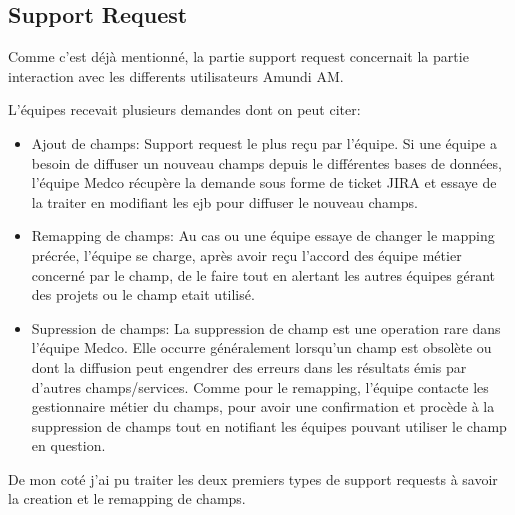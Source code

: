 \subsection{Support Request}
\par Comme c'est déjà mentionné, la partie support request concernait la partie interaction avec les differents utilisateurs Amundi AM. 
\par L'équipes recevait plusieurs demandes dont on peut citer: \\
\begin{itemize}
    \item Ajout de champs: Support request le plus reçu par l'équipe. Si une équipe a besoin de diffuser un nouveau champs depuis le différentes bases de données, l'équipe Medco récupère la demande sous forme de ticket JIRA et essaye de la traiter en modifiant les ejb pour diffuser le nouveau champs.
    \item Remapping de champs: Au cas ou une équipe essaye de changer le mapping précrée, l'équipe se charge, après avoir reçu l'accord des équipe métier concerné par le champ, de le faire tout en alertant les autres équipes gérant des projets ou le champ etait utilisé. 
    \item Supression de champs: La suppression de champ est une operation rare dans l'équipe Medco. Elle occurre généralement lorsqu'un champ est obsolète ou dont la diffusion peut engendrer des erreurs dans les résultats émis par d'autres champs/services. Comme pour le remapping, l'équipe contacte les gestionnaire métier du champs, pour avoir une confirmation et procède à la suppression de champs tout en notifiant les équipes pouvant utiliser le champ en question.
\end{itemize}
\par De mon coté j'ai pu traiter les deux premiers types de support requests à savoir la creation et le remapping de champs. 
